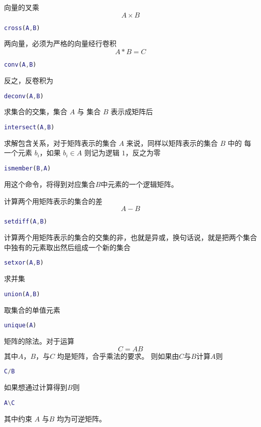 \documentclass{ctexart}
\begin{document}
  向量的叉乘
  $$A \times B$$
  \begin{lstlisting}[language=matlab]
  cross(A,B)
  \end{lstlisting}

  两向量，必须为严格的向量经行卷积
  $$A*B=C$$
  \begin{lstlisting}[language=matlab]
  conv(A,B)
  \end{lstlisting}
  反之，反卷积为
  \begin{lstlisting}[language=matlab]
  deconv(A,B)
  \end{lstlisting}

  求集合的交集，集合 $A$ 与 集合 $B$ 表示成矩阵后
  \begin{lstlisting}[language=matlab]
  intersect(A,B)
  \end{lstlisting}

  求解包含关系，对于矩阵表示的集合 $A$ 来说，同样以矩阵表示的集合 $B$ 中的
  每一个元素 $b_i$，如果 $b_i \in A$ 则记为逻辑 $1$，反之为零
  \begin{lstlisting}[language=matlab]
  ismember(B,A)
  \end{lstlisting}
  用这个命令，将得到对应集合$B$中元素的一个逻辑矩阵。

  计算两个用矩阵表示的集合的差
  $$A-B$$
 \begin{lstlisting}[language=matlab]
 setdiff(A,B)
 \end{lstlisting}

 计算两个用矩阵表示的集合的交集的非，也就是异或，换句话说，就是把两个集合中独有的元素取出然后组成一个新的集合
 \begin{lstlisting}[language=matlab]
 setxor(A,B)
 \end{lstlisting}

 求并集
 \begin{lstlisting}[language=matlab]
 union(A,B)
 \end{lstlisting}

 取集合的单值元素
 \begin{lstlisting}[language=matlab]
 unique(A)
 \end{lstlisting}

 矩阵的除法。对于运算
 $$C=AB$$
 其中$A$，$B$，与$C$ 均是矩阵，合乎乘法的要求。
 则如果由$C$与$B$计算$A$则
 \begin{lstlisting}[language=matlab]
 C/B
 \end{lstlisting}
 如果想通过计算得到$B$则
 \begin{lstlisting}[language=matlab]
 A\C
 \end{lstlisting}
 其中约束 $A$ 与$B$ 均为可逆矩阵。
\end{document}
